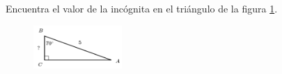 Encuentra el valor de la incógnita en el triángulo de la figura \ref{fig:lados_functrig_14}.
\begin{figure}[H]
    \begin{center}
        \includegraphics[width=0.3\textwidth]{../images/lados_functrig_14.png}
    \end{center}
    \caption{}
    \label{fig:lados_functrig_14}
\end{figure}